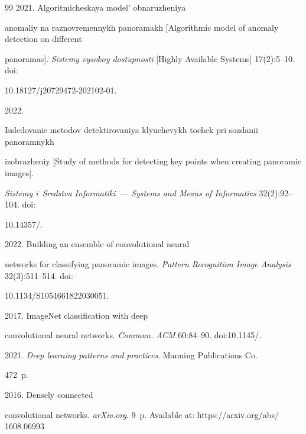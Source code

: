 {{\begin{thebibliography}{99}
 2021. Algoritmicheskaya model' obnaruzheniya 


anomaliy na raznovremennykh panoramakh [Algorithmic model of anomaly detection on different 


panoramas]. \textit{Sistemy vysokoy dostupnosti} [Highly Available Systems] 17(2):5--10. doi: 


10.18127\!/\!j20729472-202102-01.




 2022. 


Issledovanie metodov detektirovaniya klyuchevykh tochek pri sozdanii panoramnykh 


izob\-ra\-zhe\-niy [Study of methods for detecting key points when creating panoramic images]. 


\textit{Sistemy i~Sredstva Informatiki~--- Systems and Means of Informatics} 32(2):92--104. doi: 


10.14357\!/.













 2022. Building an ensemble of convolutional neural 


networks for classifying panoramic images. \textit{Pattern Recognition Image Analysis} 32(3):511--514. doi: 


10.1134\!/\!S1054661822030051.




 2017. ImageNet classification with deep 


convolutional neural networks. \textit{Commun. ACM} 60:84--90.  doi:10.1145\!/.




 2021. \textit{Deep learning patterns and practices}. Manning Publications Co. 


472~p.




 2016. Densely connected 


convolutional networks. \textit{arXiv.org}. 9~p. Available at: {\sf https://arxiv.org/abs/ 1608.06993} 



\end{thebibliography}}}
